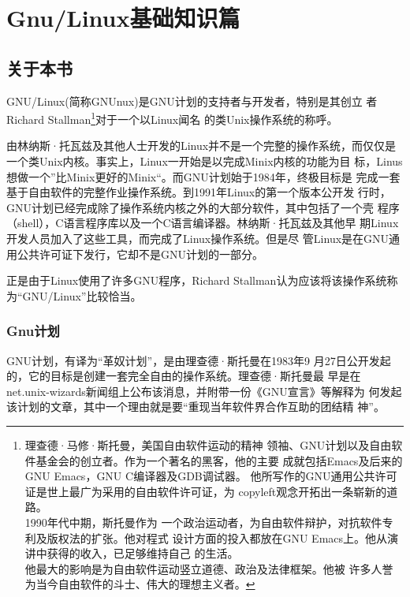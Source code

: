 \part{Gnu/Linux基础知识篇}
\label{part1}

\chapter{关于本书}
\label{part1:chap1}

GNU/Linux(简称GNUnux)是GNU计划的支持者与开发者，特别是其创立
者Richard Stallman\footnote{理查德·马修·斯托曼，美国自由软件运动的精神
  领袖、GNU计划以及自由软件基金会的创立者。作为一个著名的黑客，他的主要
  成就包括Emacs及后来的GNU Emacs，GNU C编译器及GDB调试器。
  他所写作的GNU通用公共许可证是世上最广为采用的自由软件许可证，为
  copyleft观念开拓出一条崭新的道路。\\ \indent1990年代中期，斯托曼作为
  一个政治运动者，为自由软件辩护，对抗软件专利及版权法的扩张。他对程式
  设计方面的投入都放在GNU Emacs上。他从演讲中获得的收入，已足够维持自己
  的生活。\\他最大的影响是为自由软件运动竖立道德、政治及法律框架。他被
  许多人誉为当今自由软件的斗士、伟大的理想主义者。}对于一个以Linux闻名
的类Unix操作系统的称呼。

由林纳斯·托瓦兹及其他人士开发的Linux并不是一个完整的操作系统，而仅仅是
一个类Unix内核。事实上，Linux一开始是以完成Minix内核的功能为目
标，Linus想做一个”比Minix更好的Minix“。而GNU计划始于1984年，终极目标是
完成一套基于自由软件的完整作业操作系统。到1991年Linux的第一个版本公开发
行时，GNU计划已经完成除了操作系统内核之外的大部分软件，其中包括了一个壳
程序（shell），C语言程序库以及一个C语言编译器。林纳斯·托瓦兹及其他早
期Linux开发人员加入了这些工具，而完成了Linux操作系统。但是尽
管Linux是在GNU通用公共许可证下发行，它却不是GNU计划的一部分。

正是由于Linux使用了许多GNU程序，Richard Stallman认为应该将该操作系统称
为“GNU/Linux”比较恰当。\cite{baike}

\section{Gnu计划}
\label{part1:chap1:sec:gnuPlan}

GNU计划，有译为“革奴计划”，是由理查德·斯托曼在1983年9
月27日公开发起的，它的目标是创建一套完全自由的操作系统。理查德·斯托曼最
早是在net.unix-wizards新闻组上公布该消息，并附带一份《GNU宣言》等解释为
何发起该计划的文章，其中一个理由就是要“重现当年软件界合作互助的团结精
神”。

